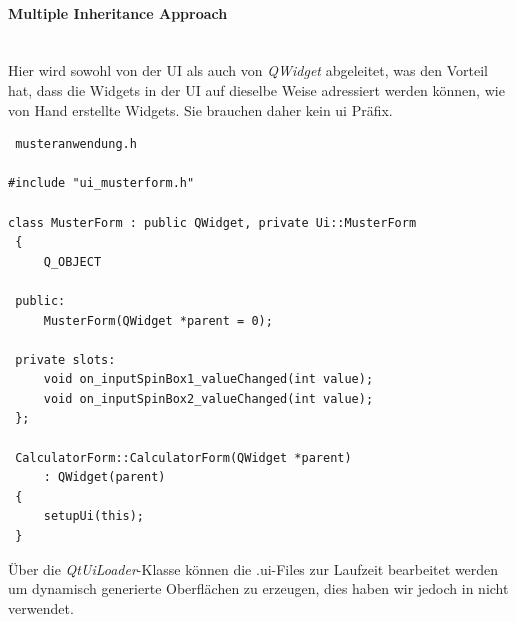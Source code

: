 \paragraph{Multiple Inheritance Approach}\mbox{}\\
Hier wird sowohl von der UI als auch von \textit{QWidget} abgeleitet, was den Vorteil hat, dass die Widgets in der UI auf dieselbe Weise adressiert
werden können, wie von Hand erstellte Widgets. Sie brauchen daher kein ui Präfix.
\begin{lstlisting}
 musteranwendung.h

#include "ui_musterform.h"

class MusterForm : public QWidget, private Ui::MusterForm
 {
     Q_OBJECT

 public:
     MusterForm(QWidget *parent = 0);

 private slots:
     void on_inputSpinBox1_valueChanged(int value);
     void on_inputSpinBox2_valueChanged(int value);
 };

 CalculatorForm::CalculatorForm(QWidget *parent)
     : QWidget(parent)
 {
     setupUi(this);
 }
\end{lstlisting}
Über die \textit{QtUiLoader}-Klasse können die .ui-Files zur Laufzeit bearbeitet werden um dynamisch generierte Oberflächen zu erzeugen, dies haben
wir jedoch in \EBP nicht verwendet\cite{QT_UIC}.\\ 
\newpage
